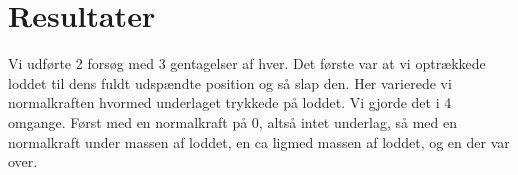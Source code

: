 \chapter{Resultater}
Vi udførte 2 forsøg med 3 gentagelser af hver. Det første var at vi optrækkede loddet til dens fuldt udspændte position og så slap den. 
Her varierede vi normalkraften hvormed underlaget trykkede på loddet. Vi gjorde det i 4 omgange. Først med en normalkraft på 0, altså intet underlag, så med en normalkraft under massen af loddet, en ca ligmed massen af loddet, og en der var over.
